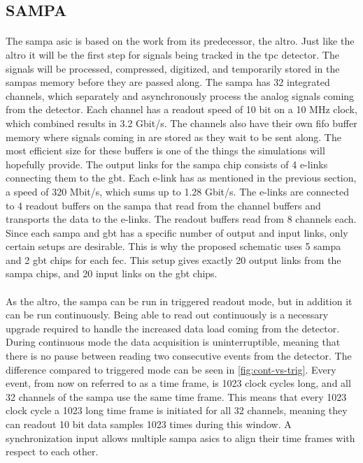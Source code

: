 \documentclass[a4paper, 12pt]{report}
\begin{document}
\subsection{SAMPA}
\label{subsec:sampa}
\paragraph{}
The \gls{sampa} \gls{asic} is based on the work from its predecessor, the \gls{altro}.
Just like the \gls{altro} it will be the first step for signals being tracked in the \gls{tpc} detector.
The signals will be processed, compressed, digitized, and temporarily stored in the \glspl{sampa} memory before they are passed along.
The \gls{sampa} has 32 integrated channels, which separately and asynchronously process the analog signals coming from the detector\cite{tdr-016}.
Each channel has a readout speed of 10 bit on a 10 MHz clock, which combined results in 3.2 Gbit/s.
The channels also have their own \gls{fifo} buffer memory where signals coming in are stored as they wait to be sent along.
The most efficient size for these buffers is one of the things the simulations will hopefully provide.
The output links for the \gls{sampa} chip consists of 4 e-links connecting them to the \gls{gbt}.
Each e-link has as mentioned in the previous section, a speed of 320 Mbit/s, which sums up to 1.28 Gbit/s\cite{tdr-015}.
The e-links are connected to 4 readout buffers on the \gls{sampa} that read from the channel buffers and transports the data to the e-links.
The readout buffers read from 8 channels each.
Since each \gls{sampa} and \gls{gbt} has a specific number of output and input links, only certain setups are desirable.
This is why the proposed schematic uses 5 \gls{sampa} and 2 \gls{gbt} chips for each \gls{fec}.
This setup gives exactly 20 output links from the \gls{sampa} chips, and 20 input links on the \gls{gbt} chips.

\paragraph{}
As the \gls{altro}, the \gls{sampa} can be run in triggered readout mode, but in addition it can be run continuously.
Being able to read out continuously is a necessary upgrade required to handle the increased data load coming from the detector.
During continuous mode the data acquisition is uninterruptible, meaning that there is no pause between reading two consecutive events from the detector.
The difference compared to triggered mode can be seen in \ref{fig:cont-vs-trig}.
Every event, from now on referred to as a time frame, is 1023 clock cycles long, and all 32 channels of the \gls{sampa} use the same time frame.
This means that every 1023 clock cycle a 1023 long time frame is initiated for all 32 channels, meaning they can readout 10 bit data samples 1023 times during this window.
A synchronization input allows multiple \gls{sampa} \gls{asic}s to align their time frames with respect to each other\cite{tdr-015}.
\end{document}
